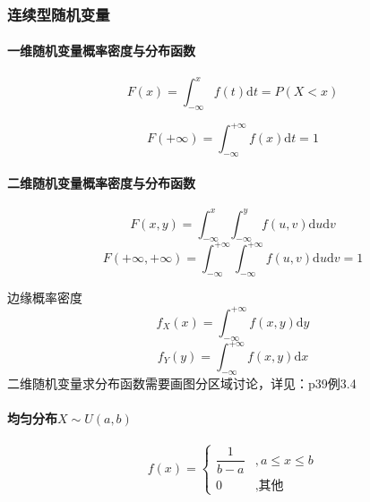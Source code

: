 \subsubsection{连续型随机变量}

\paragraph{一维随机变量概率密度与分布函数}

\begin{equation*}
  F(x)=\int_{-\infty}^{x} f(t) \mathrm{d} t = P(X<x)
\end{equation*}

\begin{equation*}
  F(+\infty)=\int_{-\infty}^{+\infty} f(x) \mathrm{d} t =1
\end{equation*}

\paragraph{二维随机变量概率密度与分布函数}
\begin{equation*}
  F(x,y)=\int_{-\infty}^{x} \int_{-\infty}^{y} f(u,v) \mathrm{d} u \mathrm{d}v
\end{equation*}
\begin{equation*}
  F(+\infty,+\infty)=\int_{-\infty}^{+\infty} \int_{-\infty}^{+\infty} f(u,v) \mathrm{d} u \mathrm{d}v=1
\end{equation*}

边缘概率密度
\begin{equation*}
  f_{X}(x)=\int_{-\infty}^{+\infty}f \left( x,y \right) \mathrm{d}y
\end{equation*}
\begin{equation*}
  f_{Y}(y)=\int_{-\infty}^{+\infty}f \left( x,y \right) \mathrm{d}x
\end{equation*}
二维随机变量求分布函数需要画图分区域讨论，详见：p39例3.4
\paragraph{均匀分布$X \sim U(a,b)$}

\begin{equation*}
  f(x)=\left\{
    \begin{array}{cl}
      \dfrac{1}{b-a} &, a\leq x \leq b \\
      0 &, \text{其他}
    \end{array}
    \right.
\end{equation*}

